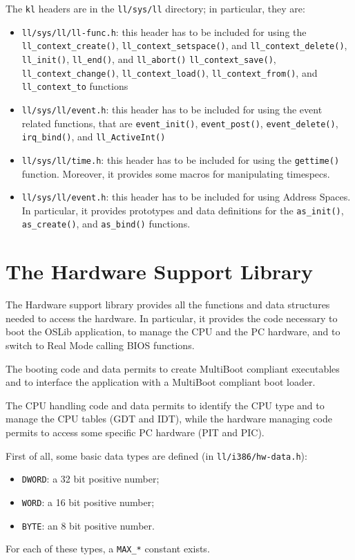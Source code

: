 \documentclass[a4paper]{report}
\begin{document}
The {\tt kl} headers are in the {\tt ll/sys/ll} directory; in particular,
they are:
\begin{itemize}
	\item {\tt ll/sys/ll/ll-func.h}: this header has to be included for
		using the {\tt ll\_context\_create()},
		{\tt ll\_context\_setspace()}, and {\tt ll\_context\_delete()},
		{\tt ll\_init()}, {\tt ll\_end()}, and {\tt ll\_abort()}
		{\tt ll\_context\_save()}, {\tt ll\_context\_change()},
		{\tt ll\_context\_load()}, {\tt ll\_context\_from()}, and
		{\tt ll\_context\_to} functions
	\item {\tt ll/sys/ll/event.h}: this header has to be included for
		using the event related functions, that are 
		{\tt event\_init()}, {\tt event\_post()},
		{\tt event\_delete()}, {\tt irq\_bind()}, and
		{\tt ll\_ActiveInt()}
	\item {\tt ll/sys/ll/time.h}: this header has to be included for
		using the {\tt gettime()} function. Moreover, it provides
		some macros for manipulating timespecs.
	\item {\tt ll/sys/ll/event.h}: this header has to be included for
		using Address Spaces. In particular, it provides prototypes
		and data definitions for the {\tt as\_init()},
		{\tt as\_create()}, and {\tt as\_bind()} functions.
\end{itemize}

\section{The Hardware Support Library}
The Hardware support library provides all the functions and data
structures needed to access the hardware. In particular, it provides
the code necessary to boot the OSLib application, to manage the CPU
and the PC hardware, and to switch to Real Mode calling BIOS functions.

The booting code and data permits to create MultiBoot compliant
executables and to interface the application with a MultiBoot compliant
boot loader.

The CPU handling code and data permits to identify the CPU type and to
manage the CPU tables (GDT and IDT), while the hardware managing code permits
to access some specific PC hardware (PIT and PIC).

First of all, some basic data types are defined (in {\tt ll/i386/hw-data.h}):
\begin{itemize}
	\item {\tt DWORD}: a 32 bit positive number;
	\item {\tt WORD}: a 16 bit positive number;
	\item {\tt BYTE}: an 8 bit positive number.
\end{itemize}
For each of these types, a {\tt MAX\_*} constant exists.
\end{document}
